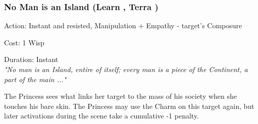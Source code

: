 \subsubsection*{No Man is an Island (Learn \textbullet\textbullet, Terra \textbullet)}

\noindent Action: Instant and resisted, Manipulation + Empathy - target's Composure

\noindent Cost: 1 Wisp

\noindent Duration: Instant\\

\noindent \textit{"No man is an Island, entire of itself; every man is a piece of the Continent, a part of the main ..."}

The Princess sees what links her target to the mass of his society when she touches his bare skin. The Princess may use the Charm on this target again, but later activations during the scene take a cumulative -1 penalty.


